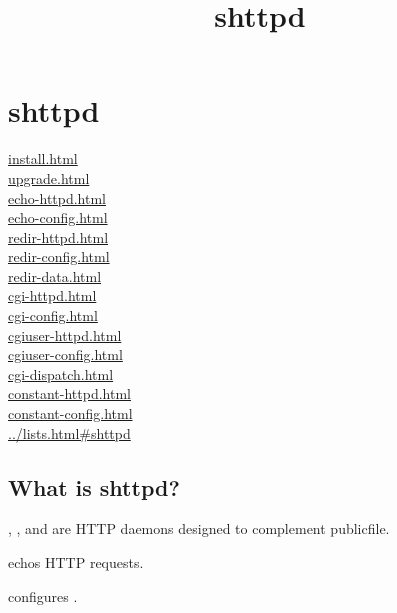 \documentclass{book}
\title{shttpd}
\begin{document}
\section{shttpd}

\begin{chapterintro}
\href{How to install shttpd}{install.html}\\
\href{How to upgrade shttpd}{upgrade.html}\\

\href{The \cmd{echo-httpd} program}{echo-httpd.html}\\
\href{The \cmd{echo-config} program}{echo-config.html}\\

\href{The \cmd{redir-httpd} program}{redir-httpd.html}\\
\href{The \cmd{redir-config} program}{redir-config.html}\\
\href{The \cmd{redir-data} program}{redir-data.html}\\

\href{The \cmd{cgi-httpd} program}{cgi-httpd.html}\\
\href{The \cmd{cgi-config} program}{cgi-config.html}\\

\href{The \cmd{cgiuser-httpd} program}{cgiuser-httpd.html}\\
\href{The \cmd{cgiuser-config} program}{cgiuser-config.html}\\

\href{The \cmd{cgi-dispatch} program}{cgi-dispatch.html}\\

\href{The \cmd{constant-httpd} program}{constant-httpd.html}\\
\href{The \cmd{constant-config} program}{constant-config.html}\\

\href{A mailing list for shttpd discussion}{../lists.html\#shttpd}\\
\end{chapterintro}

\subsection{What is shttpd?}
, , and  are HTTP
daemons designed to complement publicfile.

 echos HTTP requests.

 configures .
\end{document}
